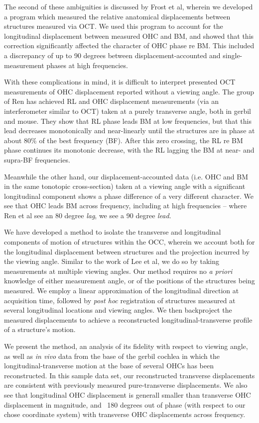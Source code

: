 \documentclass[aip,cp,amsmath,amssymb,reprint]{revtex4-2}
\begin{document}
\par{The second of these ambiguities is discussed by Frost et al, wherein we developed a program which measured the relative anatomical displacements between structures measured via OCT\cite{frost2022}. We used this program to account for the longitudinal displacement between measured OHC and BM, and showed that this correction significantly affected the character of OHC phase re BM. This included a discrepancy of up to 90 degrees between displacement-accounted and single-measurement phases at high frequencies.}
\par{With these complications in mind, it is difficult to interpret presented OCT measurements of OHC displacement reported without a viewing angle. The group of Ren has achieved RL and OHC displacement measurements (via an interferometer similar to OCT) taken at a purely transverse angle, both in gerbil and mouse\cite{he2018,ren2016}. They show that RL phase leads BM at low frequencies, but that this lead decreases monotonically and near-linearly until the structures are in phase at about 80\% of the best frequency (BF). After this zero crossing, the RL re BM phase continues its monotonic decrease, with the RL lagging the BM at near- and supra-BF frequencies.}
\par{Meanwhile the other hand, our displacement-accounted data (i.e. OHC and BM in the same tonotopic cross-section) taken at a viewing angle with a significant longitudinal component shows a phase difference of a very different character. We see that OHC leads BM across frequency, including at high frequencies -- where Ren et al see an 80 degree \textit{lag}, we see a 90 degree \textit{lead}.}
\par{We have developed a method to isolate the transverse and longitudinal components of motion of structures within the OCC, wherein we account both for the longitudinal displacement between structures and the projection incurred by the viewing angle. Similar to the work of Lee et al, we do so by taking measurements at multiple viewing angles\cite{lee2016}. Our method requires no \textit{a priori} knowledge of either measurement angle, or of the positions of the structures being measured. We employ a linear approximation of the longitudinal direction at acquisition time, followed by \textit{post hoc} registration of structures measured at several longitudinal locations and viewing angles. We then backproject the measured displacements to achieve a reconstructed longitudinal-transverse profile of a structure's motion.}
\par{We present the method, an analysis of its fidelity with respect to viewing angle, as well as \textit{in vivo} data from the base of the gerbil cochlea in which the longitudinal-transverse motion at the base of several OHCs has been reconstructed. In this sample data set, our reconstructed transverse displacements are consistent with previously measured pure-transverse displacements. We also see that longitudinal OHC displacement is generall smaller than transverse OHC displacement in magnitude, and ~180 degrees out of phase (with respect to our chose coordinate system) with transverse OHC displacements across frequency.}
\end{document}
